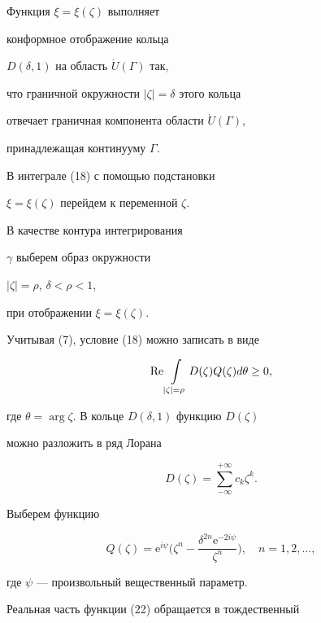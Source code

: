 \begin{pf}


Функция $\xi=\xi(\zeta)$ выполняет


конформное отображение кольца


$D(\delta,1)$ на область $\Dot{U}(\Gamma)$ так,


что граничной окружности $|\zeta|=\delta$ этого кольца


отвечает граничная компонента области $\Dot{U}(\Gamma)$,


принадлежащая континууму $\Gamma$.


В интеграле (18) с помощью подстановки


$\xi=\xi(\zeta)$ перейдем к переменной $\zeta$.


В качестве контура интегрирования


$\gamma$ выберем образ окружности 


$|\zeta|=\rho$, $\delta<\rho<1$,


при отображении $\xi=\xi(\zeta)$.


Учитывая (7), условие (18) можно записать в виде


\begin{equation}


\re \int\limits_{|\zeta|=\rho}D(\zeta)Q(\zeta)d\theta\ge 0,


\end{equation}


где $\theta=\arg\zeta$. В кольце $D(\delta,1)$ функцию $D(\zeta)$ 


можно разложить в ряд Лорана


\begin{equation}


D(\zeta)=\sum\limits_{-\infty}^{+\infty}c_{k}\zeta^{k}.


\end{equation}


Выберем функцию


\begin{equation}


Q(\zeta)=


\mathrm e^{i\psi}\bigg(\zeta^{n}-\frac{\delta^{2n}


\mathrm e^{-2i\psi}}{\zeta^{n}}\bigg),


\quad n=1,2,\dotsc,


\end{equation}


где $\psi$ --- произвольный вещественный параметр.


Реальная часть функции (22) обращается в тождественный



\end{pf}
